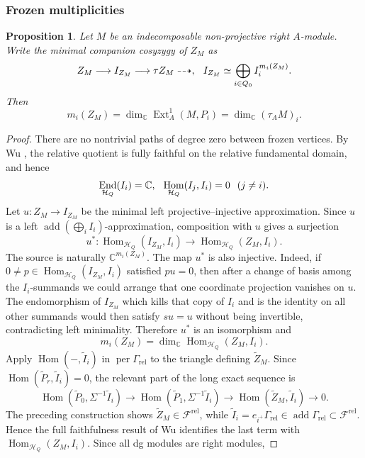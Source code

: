 \documentclass[11pt,reqno]{article}
\numberwithin{equation}{section}
\newtheorem{proposition}[proposition]{Proposition}
\theoremstyle{definition}
\DeclareMathOperator{\add}{add}
\DeclareMathOperator{\End}{End}
\DeclareMathOperator{\Hom}{Hom}
\DeclareMathOperator{\Ext}{Ext}
\newcommand{\kk}{\mathbb C}
\begin{document}
\subsubsection{Frozen multiplicities}
\begin{proposition}\label{prop:principal-multiplicity}
Let $M$ be an indecomposable non-projective right $A$-module. Write the minimal companion cosyzygy of $Z_M$ as
\[
 Z_M\longrightarrow I_{Z_M}\longrightarrow\tau Z_M\dashrightarrow,
  \hspace{2.5mm}I_{Z_M}\simeq\bigoplus_{i\in Q_0}I_i^{m_i(Z_M)}.
\]
Then
\[
 m_i(Z_M)=\dim_{\kk}\Ext_A^1(M,P_i)=\dim_{\kk}(\tau_A M)_i.
\]
\end{proposition}
\begin{proof}
There are no nontrivial paths of degree zero between frozen vertices.  By Wu \cite[Proposition~5.20]{WuRelative}, the relative quotient is fully faithful on the relative fundamental domain, and hence
\[
 \End_{\mathcal H_Q}(I_i)=\kk,
  \hspace{2.5mm} \Hom_{\mathcal H_Q}(I_j,I_i)=0 \hspace{2.5mm}(j\ne i).
\]
Let $u:Z_M\to I_{Z_M}$ be the minimal left projective--injective approximation.  Since $u$ is a left $\add(\bigoplus_i I_i)$-approximation, composition with $u$ gives a surjection
\[
 u^*: \Hom_{\mathcal H_Q}(I_{Z_M},I_i)\longrightarrow
 \Hom_{\mathcal H_Q}(Z_M,I_i).
\]
The source is naturally $\kk^{m_i(Z_M)}$.  The map $u^*$ is also injective.  Indeed, if $0\ne p\in\Hom_{\mathcal H_Q}(I_{Z_M},I_i)$ satisfied $pu=0$, then after a change of basis among the $I_i$-summands we could arrange that one coordinate projection vanishes on $u$.  The endomorphism of $I_{Z_M}$ which kills that copy of $I_i$ and is the identity on all other summands would then satisfy $su=u$ without being invertible, contradicting left minimality.  Therefore $u^*$ is an isomorphism and
\begin{equation}\label{eq:principal-m-hom}
 m_i(Z_M)=\dim_{\kk}\Hom_{\mathcal H_Q}(Z_M,I_i).
\end{equation}
Apply $\Hom(-,\widetilde I_i)$ in $\operatorname{per}\Gamma_{\mathrm{rel}}$ to the triangle defining $\widetilde Z_M$.  Since $\Hom(\widetilde P_r,\widetilde I_i)=0$, the relevant part of the long exact sequence is
\[
 \Hom(\widetilde P_0,\Sigma^{-1}\widetilde I_i)
 \longrightarrow \Hom(\widetilde P_1,\Sigma^{-1}\widetilde I_i)
 \longrightarrow \Hom(\widetilde Z_M,\widetilde I_i)\longrightarrow0.
\]
The preceding construction shows $\widetilde Z_M\in\mathcal F^{\mathrm{rel}}$, while $\widetilde I_i=e_{i^+}\Gamma_{\mathrm{rel}}\in\add\Gamma_{\mathrm{rel}}\subset\mathcal F^{\mathrm{rel}}$.  Hence the full faithfulness result of Wu \cite[Proposition~5.20]{WuRelative} identifies the last term with $\Hom_{\mathcal H_Q}(Z_M,I_i)$.  Since all dg modules are right modules,

\end{proof}
\end{document}
